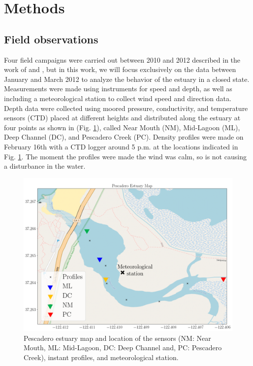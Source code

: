 \documentclass[tesis.tex]{subfiles}
\begin{document}
    
\section{Methods}

\subsection{Field observations}

Four field campaigns were carried out between 2010 and 2012 described in the work of \cite{Williams2014} and \cite{williams2016}, but in this work, we will focus exclusively on the data between January and March 2012 to analyze the behavior of the estuary in a closed state. Measurements were made using instruments for speed and depth, as well as including a meteorological station to collect wind speed and direction data. Depth data were collected using moored pressure, conductivity, and temperature sensors (CTD) placed at different heights and distributed along the estuary at four points as shown in (Fig. \ref{fig:mapPDO}), called Near Mouth (NM), Mid-Lagoon (ML), Deep Channel (DC), and Pescadero Creek (PC). Density profiles were made on February 16th with a CTD logger around 5 p.m. at the locations indicated in Fig. \ref{fig:mapPDO}. The moment the profiles were made the wind was calm, so is not causing a disturbance in the water.


\begin{figure}[h!]
    \centering
    \includegraphics[scale=0.6]{Imagenes/mapa2.png}
    \caption{Pescadero estuary map and location of the sensors (NM: Near Mouth, ML: Mid-Lagoon, DC: Deep Channel and, PC: Pescadero Creek), instant profiles, and meteorological station. }
    \label{fig:mapPDO}
\end{figure}
\end{document}
